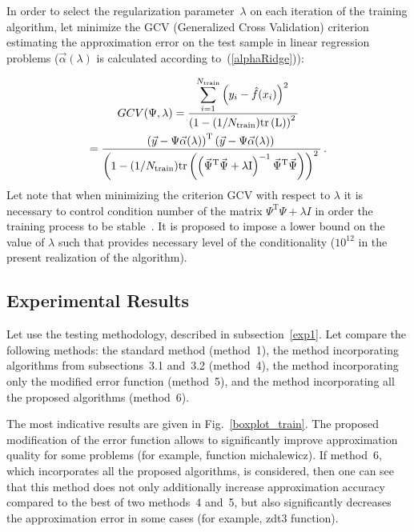 \begin{multicols}{2}
In order to select the regularization parameter~$\lambda$ on each iteration of 
the training algorithm, let minimize the GCV  (Generalized Cross 
Validation) criterion~\cite{elementsOfStatLearning} estimating the approximation error
on the test sample in linear regression problems (${\vec \alpha }\left( \lambda \right)$ 
is calculated according to~(\ref{alphaRidge})):

\noindent
\begin{multline*}
  GCV(\Psi, \lambda) = %
    \fr{\sum\limits_{i=1}^{N_{\mathrm{train}}} \left( y_i - \hat f(x_i)\right)^2 }
    {\left( 1 - ({1}/N_{\mathrm{train}}) \mathrm{tr}\left( \mathrm{L}  \right) \right)^2  }\\
   = %
    \fr{\left(\vec y - \Psi \vec \alpha(\lambda)\right)^{\mathrm{T}} 
    \left(\vec y - \Psi \vec \alpha(\lambda)\right)}
    {\left( 1 - ({1}/{N_{\mathrm{train}}})\mathrm{tr}\left(  
     \left( \vec{\Psi}^{\mathrm{T}} \vec{\Psi} + \lambda \mathrm{I} \right)^{-1} 
     \vec{\Psi}^{\mathrm{T}} \vec{\Psi}  \right) \right)^2  }\,.
\end{multline*}
Let  note that when minimizing the criterion
GCV with respect to $\lambda$ it is necessary to control condition 
number of the matrix $\Psi^{\mathrm{T}}\Psi + \lambda I$ in order the 
training process to be stable~\cite{oldRegul}.
It is proposed to impose a lower bound on the value of $\lambda$ such that provides
necessary level of the conditionality ($10^{12}$ in the present realization of the algorithm).



\subsection{Experimental Results}
\label{exp2}

\noindent
Let use the testing methodology, described in subsection~\ref{exp1}.
Let compare the following methods: the standard method (method~1), the 
method incorporating algorithms from subsections~3.1 and~3.2 (method~4), 
the method incorporating only the modified error function (method~5),  
and the method incorporating all the proposed algorithms  (method~6).



The most indicative results are given in Fig.~\ref{boxplot_train}.
The proposed modification of the error function allows to significantly improve 
approximation quality for some problems (for example, function michalewicz).
If method~6, which incorporates all the proposed algorithms,   is considered, then one 
can see that this method does not only additionally increase approximation accuracy 
compared to the best of two methods~4 and~5, but also significantly decreases 
the approximation error in some cases (for example, zdt3 function).


\end{multicols}
